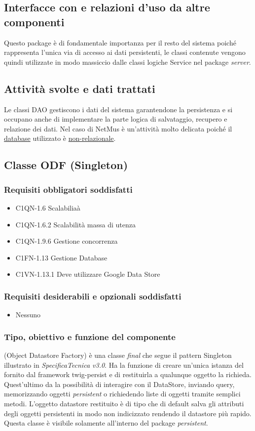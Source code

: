 \subsection*{Interfacce con e
relazioni d'uso da altre componenti} Questo package \`e di fondamentale importanza per il resto del sistema poich\'e
rappresenta l'unica via di accesso ai dati persistenti, le classi contenute
vengono quindi utilizzate in modo massiccio dalle classi logiche Service nel
package \emph{server}.
\subsection*{Attivit\`a svolte e dati trattati}
Le classi DAO gestiscono i dati del sistema garantendone la persistenza e si
occupano anche di implementare la parte logica di salvataggio, recupero e
relazione dei dati. Nel caso di NetMus \`e un'attivit\`a molto delicata poich\'e il
\underline{database} utilizzato \`e \underline{non-relazionale}.

\subsection{Classe ODF (Singleton)}
\subsubsection*{Requisiti obbligatori soddisfatti}
\begin{itemize}
    \item C1QN-1.6 Scalabilia\`a
    \item C1QN-1.6.2 Scalabilit\`a massa di utenza
    \item C1QN-1.9.6 Gestione concorrenza
    \item C1FN-1.13 Gestione Database
    \item C1VN-1.13.1 Deve utilizzare Google Data Store
\end{itemize}
\subsubsection*{Requisiti desiderabili e opzionali soddisfatti}
\begin{itemize}
    \item Nessuno
\end{itemize}
\subsubsection*{Tipo, obiettivo e funzione del componente}
 (Object Datastore Factory) \`e una classe \emph{final} che segue il
pattern Singleton illustrato in \emph{SpecificaTecnica v3.0}. Ha la funzione di creare un'unica istanza del
 fornito dal framework twig-persist e di restituirla a
qualunque oggetto la richieda. Quest'ultimo da la possibilit\`a di interagire con il DataStore, inviando query, memorizzando oggetti \emph{persistent} o richiedendo liste di oggetti
tramite semplici metodi. L'oggetto datastore restituito \`e di tipo
 che di default salva gli attributi degli oggetti
persistenti in modo non indicizzato rendendo il datastore pi\`u rapido.\\
Questa classe \`e visibile solamente all'interno del package \emph{persistent}.
